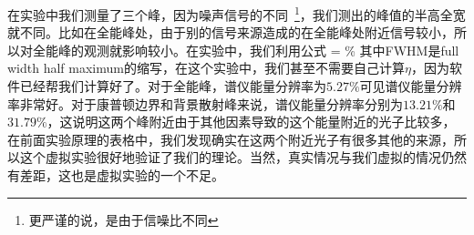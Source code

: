 \documentclass[11pt,a4paper]{ctexart}
\begin{document}
在实验中我们测量了三个峰，因为噪声信号的不同~\footnote{更严谨的说，是由于信噪比不同}，我们测出的峰值的半高全宽就不同。比如在全能峰处，由于别的信号来源造成的在全能峰处附近信号较小，所以对全能峰的观测就影响较小。在实验中，我们利用公式
\beq
\eta = \%
\eeq
其中FWHM是full width half maximum的缩写，在这个实验中，我们甚至不需要自己计算$\eta$，因为软件已经帮我们计算好了。对于全能峰，谱仪能量分辨率为$5.27\%$可见谱仪能量分辨率非常好。对于康普顿边界和背景散射峰来说，谱仪能量分辨率分别为$13.21\%$和$31.79\%$，这说明这两个峰附近由于其他因素导致的这个能量附近的光子比较多，在前面实验原理的表格中，我们发现确实在这两个附近光子有很多其他的来源，所以这个虚拟实验很好地验证了我们的理论。当然，真实情况与我们虚拟的情况仍然有差距，这也是虚拟实验的一个不足。





\end{document}
